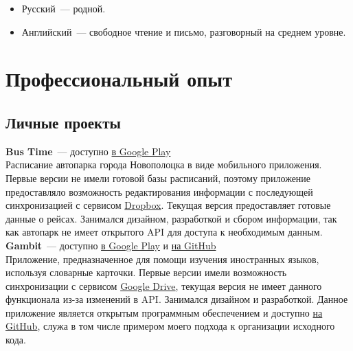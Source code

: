     \begin{itemize}

      \item Русский~--- родной.

      \item Английский~--- свободное чтение и письмо, разговорный на среднем уровне.

    \end{itemize}


  \section*{Профессиональный опыт}

    \subsection*{Личные проекты}

      \textbf{Bus Time}~--- доступно \href{https://play.google.com/store/apps/details?id=ru.ming13.bustime}{в Google Play} \\

        Расписание автопарка города Новополоцка в виде мобильного приложения.
        Первые версии не имели готовой базы расписаний, поэтому приложение
        предоставляло возможность редактирования информации с последующей синхронизацией
        с сервисом \href{https://dropbox.com}{Dropbox}. Текущая версия
        предоставляет готовые данные о рейсах. Занимался дизайном, разработкой
        и сбором информации, так как автопарк не имеет открытого API для доступа
        к необходимым данным. \\

      \textbf{Gambit}~--- доступно \href{https://play.google.com/store/apps/details?id=ru.ming13.gambit}{в Google Play}
        и \href{https://github.com/ming13/gambit}{на GitHub} \\

        Приложение, предназначенное для помощи изучения иностранных языков,
        используя словарные карточки. Первые версии имели возможность
        синхронизации с сервисом
        \href{https://drive.google.com}{Google Drive}, текущая версия
        не имеет данного функционала из-за изменений в API. Занимался дизайном
        и разработкой. Данное приложение является открытым программным обеспечением
        и доступно \href{https://github.com/ming13/gambit}{на GitHub},
        служа в том числе примером моего подхода к организации исходного кода.

